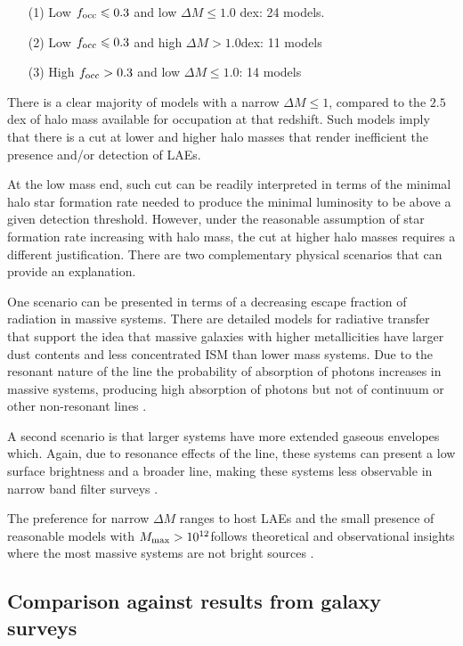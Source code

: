 \documentclass[usenatbib]{mn2e}
\newcommand{\ly}{{\ifmmode{{\rm Ly}\alpha}\else{Ly$\alpha$~}\fi}}
\newcommand{\hMsun}{{\ifmmode{h^{-1}{\rm
        {M_{\odot}}}}\else{$h^{-1}{\rm{M_{\odot}}}$}\fi}}
\begin{document}
\begin{itemize}
\item[(1)] Low $f_{\rm occ}\leq 0.3$ and low $\Delta M\leq 1.0$
  dex: 24 models.
\item[(2)] Low $f_{\rm occ}\leq 0.3$ and high $\Delta M > 1.0$dex: 11
  models
\item[(3)] High $f_{\rm occ}> 0.3$ and low $\Delta M\leq 1.0$: 14 models
\end{itemize}

There is a clear majority of models with a narrow $\Delta M\leq
1$, compared to the $2.5$dex of halo mass available for occupation at
that redshift. Such models imply that there is a cut at lower and higher halo
masses that render inefficient the presence and/or detection of LAEs.

At the low mass end, such cut can be readily interpreted in terms of the
minimal halo star formation rate needed to produce the minimal \ly 
luminosity to be above a given detection threshold.  However, under
the reasonable assumption of star formation rate increasing with halo
mass, the cut at higher halo masses requires a different
justification. There are two complementary physical scenarios that can
provide an explanation.

One scenario can be presented in terms of a decreasing escape
fraction of \ly radiation in massive systems. There are detailed models for
radiative transfer that support the idea that massive galaxies with
higher metallicities have larger dust contents and less concentrated
ISM than lower mass systems. Due to the resonant nature of the
\ly line the probability of absorption  of \ly photons increases in
massive systems, producing high absorption of \ly photons but not of
continuum or other non-resonant lines
\citep{Laursen2009,ForeroRomero2011}. 

A second scenario is that larger systems have more extended gaseous
envelopes which. Again, due to resonance effects of the \ly line,
these systems can present a low surface brightness and a broader line,
making these systems less observable in narrow band filter surveys
\citep{Laursen2009,Zheng2010}.  

The preference for narrow $\Delta M$ ranges to host LAEs 
and the small presence of reasonable models with $M_{\rm max}>
10^{12}$\hMsun follows theoretical and observational
insights where the most massive systems are not bright \ly sources
\citep{ForeroRomero2012,Shapley2003}. 

\subsection{Comparison against results from galaxy surveys}
\end{document}
